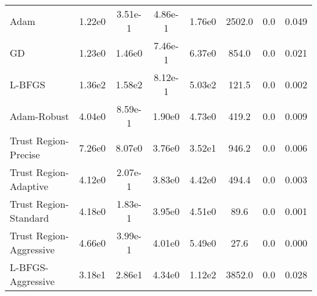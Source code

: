 \documentclass{article}
\begin{document}
\begin{table}[htbp]
{\begin{tabular}{p{2.5cm}*{7}{c}}
Adam & 1.22e0 & 3.51e-1 & 4.86e-1 & 1.76e0 & 2502.0 & 0.0 & 0.049 \\
GD & 1.23e0 & 1.46e0 & 7.46e-1 & 6.37e0 & 854.0 & 0.0 & 0.021 \\
L-BFGS & 1.36e2 & 1.58e2 & 8.12e-1 & 5.03e2 & 121.5 & 0.0 & 0.002 \\
Adam-Robust & 4.04e0 & 8.59e-1 & 1.90e0 & 4.73e0 & 419.2 & 0.0 & 0.009 \\
Trust Region-Precise & 7.26e0 & 8.07e0 & 3.76e0 & 3.52e1 & 946.2 & 0.0 & 0.006 \\
Trust Region-Adaptive & 4.12e0 & 2.07e-1 & 3.83e0 & 4.42e0 & 494.4 & 0.0 & 0.003 \\
Trust Region-Standard & 4.18e0 & 1.83e-1 & 3.95e0 & 4.51e0 & 89.6 & 0.0 & 0.001 \\
Trust Region-Aggressive & 4.66e0 & 3.99e-1 & 4.01e0 & 5.49e0 & 27.6 & 0.0 & 0.000 \\
L-BFGS-Aggressive & 3.18e1 & 2.86e1 & 4.34e0 & 1.12e2 & 3852.0 & 0.0 & 0.028 \\
\bottomrule
\end{tabular}
}
\end{table}
\end{document}
